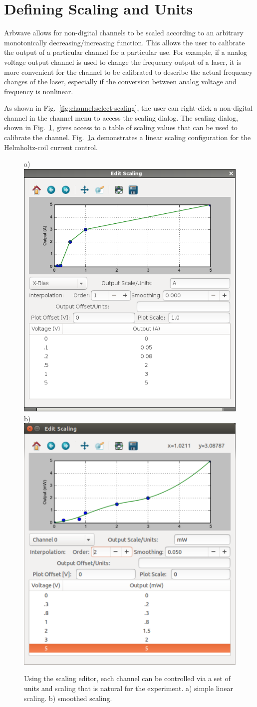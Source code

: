 \section{Defining Scaling and Units}\label{sec:channels:scaling}
Arbwave allows for non-digital channels to be scaled according to an arbitrary
monotonically decreasing/increasing function.  This allows the user to calibrate
the output of a particular channel for a particular use.  For example, if a
analog voltage output channel is used to change the frequency output of a laser,
it is more convenient for the channel to be calibrated to describe the actual
frequency changes of the laser, especially if the conversion between
analog voltage and frequency is nonlinear.

As shown in Fig.~\ref{fig:channel:select-scaling},
the user can right-click a non-digital channel in the channel menu to access the
scaling dialog.  The scaling dialog, shown in Fig.~\ref{fig:channel:scaling}, gives
access to a table of scaling values that can be used to calibrate the channel.
Fig.~\ref{fig:channel:scaling}a demonstrates a linear scaling configuration for
the Helmholtz-coil current control.


\begin{figure}[hb]
  \centerline{
    a) \includegraphics[width=.4\textwidth]{figures/scaling-v0}
    \hspace{.2em}
    b) \includegraphics[width=.4\textwidth]{figures/scaling}
  }
  \caption{
    Using the scaling editor, each channel can be controlled via a set of units
    and scaling that is natural for the experiment.  a) simple linear scaling.
    b) smoothed scaling.
  }
  \label{fig:channel:scaling}
\end{figure}

